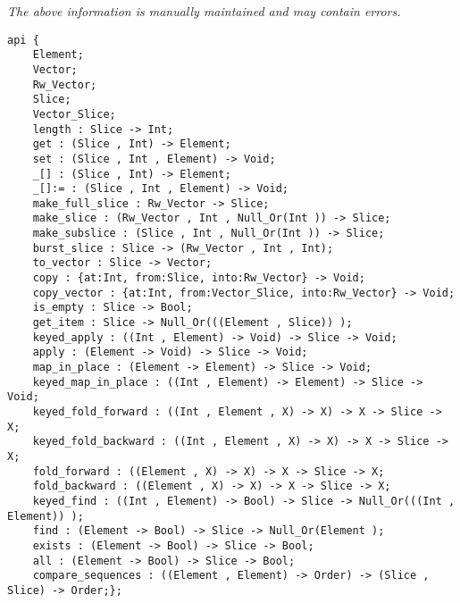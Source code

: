 \label{api:Typelocked\_Rw\_Vector\_Slice}

{\tiny \it The above information is manually maintained and may contain errors.}
\begin{verbatim}
api {
    Element;
    Vector;
    Rw_Vector;
    Slice;
    Vector_Slice;
    length : Slice -> Int;
    get : (Slice , Int) -> Element;
    set : (Slice , Int , Element) -> Void;
    _[] : (Slice , Int) -> Element;
    _[]:= : (Slice , Int , Element) -> Void;
    make_full_slice : Rw_Vector -> Slice;
    make_slice : (Rw_Vector , Int , Null_Or(Int )) -> Slice;
    make_subslice : (Slice , Int , Null_Or(Int )) -> Slice;
    burst_slice : Slice -> (Rw_Vector , Int , Int);
    to_vector : Slice -> Vector;
    copy : {at:Int, from:Slice, into:Rw_Vector} -> Void;
    copy_vector : {at:Int, from:Vector_Slice, into:Rw_Vector} -> Void;
    is_empty : Slice -> Bool;
    get_item : Slice -> Null_Or(((Element , Slice)) );
    keyed_apply : ((Int , Element) -> Void) -> Slice -> Void;
    apply : (Element -> Void) -> Slice -> Void;
    map_in_place : (Element -> Element) -> Slice -> Void;
    keyed_map_in_place : ((Int , Element) -> Element) -> Slice -> Void;
    keyed_fold_forward : ((Int , Element , X) -> X) -> X -> Slice -> X;
    keyed_fold_backward : ((Int , Element , X) -> X) -> X -> Slice -> X;
    fold_forward : ((Element , X) -> X) -> X -> Slice -> X;
    fold_backward : ((Element , X) -> X) -> X -> Slice -> X;
    keyed_find : ((Int , Element) -> Bool) -> Slice -> Null_Or(((Int , Element)) );
    find : (Element -> Bool) -> Slice -> Null_Or(Element );
    exists : (Element -> Bool) -> Slice -> Bool;
    all : (Element -> Bool) -> Slice -> Bool;
    compare_sequences : ((Element , Element) -> Order) -> (Slice , Slice) -> Order;};
\end{verbatim}
\index[fun]{\_[]:=}
\index[fun]{\_[]}
